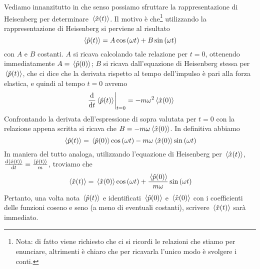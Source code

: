 \begin{soluzione}
   Vediamo innanzitutto in che senso possiamo sfruttare la rappresentazione di Heisenberg per determinare $\expval*{\hat{x}(t)}$. Il motivo è che\footnote{Nota: di fatto viene richiesto che ci si ricordi le relazioni che stiamo per enunciare, altrimenti è chiaro che per ricavarla l'unico modo è svolgere i conti.} utilizzando la rappresentazione di Heisenberg si perviene al risultato
   \begin{equation*}
      \expval*{\hat{p}(t)}
      =A\cos{(\omega t)} + B\sin{(\omega t)}
   \end{equation*}
   con $A$ e $B$ costanti. $A$ si ricava calcolando tale relazione per $t=0$, ottenendo immediatamente $A=\expval*{\hat{p}(0)}$; $B$ si ricava dall'equazione di Heisenberg stessa per $\expval*{\hat{p}(t)}$, che ci dice che la derivata rispetto al tempo dell'impulso è pari alla forza elastica, e quindi al tempo $t=0$ avremo
   \begin{equation*}
      \eval*{\dv{t}\expval*{\hat{p}(t)}}_{t=0}=-m\omega^2 \expval*{\hat{x}(0)}
   \end{equation*}
   Confrontando la derivata dell'espressione di sopra valutata per $t=0$ con la relazione appena scritta si ricava che $B=-m\omega\expval*{\hat{x}(0)}$. In definitiva abbiamo
   \begin{equation*}
      \expval*{\hat{p}(t)}
      =\expval*{\hat{p}(0)}\cos{(\omega t)} - m\omega\expval*{\hat{x}(0)}\sin{(\omega t)}
   \end{equation*}
   In maniera del tutto analoga, utilizzando l'equazione di Heisenberg per $\expval*{\hat{x}(t)}$, $\dv{\expval*{\hat{x}(t)}}{t}=\frac{\expval*{\hat{p}(t)}}{m}$, troviamo che
   \begin{equation*}
      \expval*{\hat{x}(t)}
      =\expval*{\hat{x}(0)}\cos{(\omega t)} + \frac{\expval*{\hat{p}(0)}}{m\omega}\sin{(\omega t)}
   \end{equation*}
   Pertanto, una volta nota $\expval*{\hat{p}(t)}$ e identificati $\expval*{\hat{p}(0)}$ e $\expval*{\hat{x}(0)}$ con i coefficienti delle funzioni coseno e seno (a meno di eventuali costanti), scrivere $\expval*{\hat{x}(t)}$ sarà immediato.
   

\end{soluzione}
